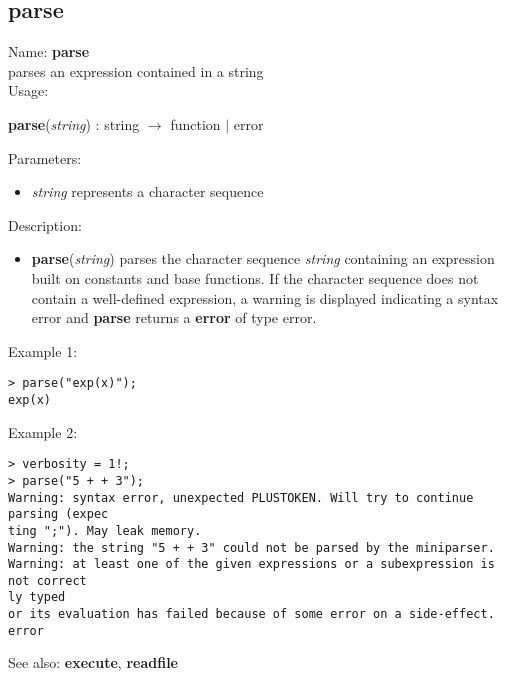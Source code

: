 \subsection{ parse }
\noindent Name: \textbf{parse}\\
parses an expression contained in a string\\

\noindent Usage: 
\begin{center}
\textbf{parse}(\emph{string}) : \textsf{string} $\rightarrow$ \textsf{function} $|$ \textsf{error}\\
\end{center}
Parameters: 
\begin{itemize}
\item \emph{string} represents a character sequence
\end{itemize}
\noindent Description: \begin{itemize}

\item \textbf{parse}(\emph{string}) parses the character sequence \emph{string} containing
   an expression built on constants and base functions.
   If the character sequence does not contain a well-defined expression,
   a warning is displayed indicating a syntax error and \textbf{parse} returns
   a \textbf{error} of type \textsf{error}.
\end{itemize}
\noindent Example 1: 
\begin{center}\begin{minipage}{15cm}\begin{Verbatim}[frame=single]
> parse("exp(x)");
exp(x)
\end{Verbatim}
\end{minipage}\end{center}
\noindent Example 2: 
\begin{center}\begin{minipage}{15cm}\begin{Verbatim}[frame=single]
> verbosity = 1!;
> parse("5 + + 3");
Warning: syntax error, unexpected PLUSTOKEN. Will try to continue parsing (expec
ting ";"). May leak memory.
Warning: the string "5 + + 3" could not be parsed by the miniparser.
Warning: at least one of the given expressions or a subexpression is not correct
ly typed
or its evaluation has failed because of some error on a side-effect.
error
\end{Verbatim}
\end{minipage}\end{center}
See also: \textbf{execute}, \textbf{readfile}
